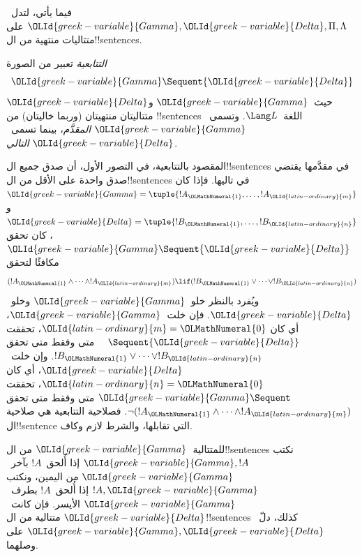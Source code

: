 \documentclass[../../../include/open-logic-section]{subfiles}
\begin{document}
      {}
      {}


فيما يأتي، لتدل~${\OLId{greek-variable}{Gamma}}, {\OLId{greek-variable}{Delta}}, \Pi, \Lambda$ على متتاليات منتهية
من ال!!{sentence}s.

\begin{defn}[التتابعية]
\emph{التتابعية} تعبير من الصورة
\[
{\OLId{greek-variable}{Gamma}} \Sequent {\OLId{greek-variable}{Delta}}
\]
حيث~${\OLId{greek-variable}{Gamma}}$ و${\OLId{greek-variable}{Delta}}$ متتاليتان منتهيتان (وربما خاليتان) من
!!{sentence}s اللغة~$\Lang L$. وتسمى~${\OLId{greek-variable}{Gamma}}$ \emph{المقدَّم}، بينما
تسمى~${\OLId{greek-variable}{Delta}}$ \emph{التالي}.
\end{defn}

\begin{explain}
المقصود بالتتابعية، في التصور الأول، أن صدق جميع ال!!{sentence}s في مقدَّمها يقتضي صدق واحدة على الأقل من ال!!{sentence}s في تاليها.
فإذا كان ${\OLId{greek-variable}{Gamma}} = \tuple{!A_{\OLMathNumeral{1}}, \dots, !A_{\OLId{latin-ordinary}{m}}}$ و
${\OLId{greek-variable}{Delta}} = \tuple{!B_{\OLMathNumeral{1}}, \dots, !B_{\OLId{latin-ordinary}{n}}}$، كان تحقق ${\OLId{greek-variable}{Gamma}} \Sequent {\OLId{greek-variable}{Delta}}$
مكافئًا لتحقق
\[
(!A_{\OLMathNumeral{1}} \land \cdots \land !A_{\OLId{latin-ordinary}{m}}) \lif (!B_{\OLMathNumeral{1}} \lor \cdots \lor
!B_{\OLId{latin-ordinary}{n}})
\]
ويُفرد بالنظر خلو~${\OLId{greek-variable}{Gamma}}$ وخلو~${\OLId{greek-variable}{Delta}}$.
فإن خلت~${\OLId{greek-variable}{Gamma}}$، أي كان ${\OLId{latin-ordinary}{m}} = {\OLMathNumeral{0}}$، تحققت $\quad
\Sequent {\OLId{greek-variable}{Delta}}$ متى وفقط متى تحقق
$!B_{\OLMathNumeral{1}} \lor \dots \lor !B_{\OLId{latin-ordinary}{n}}$.
وإن خلت~${\OLId{greek-variable}{Delta}}$، أي كان ${\OLId{latin-ordinary}{n}} = {\OLMathNumeral{0}}$، تحققت ${\OLId{greek-variable}{Gamma}} \Sequent \quad$
متى وفقط متى تحقق
$\lnot(!A_{\OLMathNumeral{1}} \land \dots \land !A_{\OLId{latin-ordinary}{m}})$.
فصلاحية التتابعية هي صلاحية ال!!{sentence} التي تقابلها، والشرط لازم وكاف.
\end{explain}

للمتتالية~${\OLId{greek-variable}{Gamma}}$ من ال!!{sentence}s نكتب ${\OLId{greek-variable}{Gamma}}, !A$
إذا أُلحق~$!A$ بآخر~${\OLId{greek-variable}{Gamma}}$ من اليمين، ونكتب $!A, {\OLId{greek-variable}{Gamma}}$
إذا أُلحق~$!A$ بطرف~${\OLId{greek-variable}{Gamma}}$ الأيسر. فإن كانت~${\OLId{greek-variable}{Delta}}$
متتالية من ال!!{sentence}s كذلك، دلّ~${\OLId{greek-variable}{Gamma}}, {\OLId{greek-variable}{Delta}}$ على وصلهما.
\end{document}
